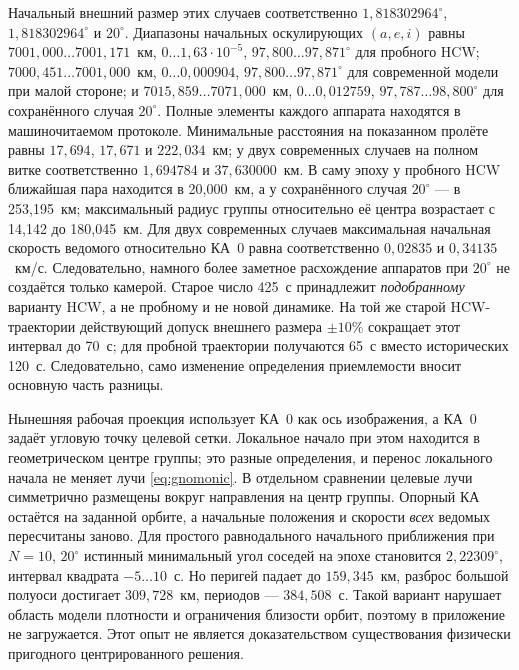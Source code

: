 \documentclass[a4paper,12pt]{article}
\begin{document}
Начальный внешний размер этих случаев соответственно
$1{,}818302964^\circ$, $1{,}818302964^\circ$ и $20^\circ$.
Диапазоны начальных оскулирующих $(a,e,i)$ равны
$7001{,}000\ldots7001{,}171$~км,
$0\ldots1{,}63\cdot10^{-5}$, $97{,}800\ldots97{,}871^\circ$
для пробного HCW; $7000{,}451\ldots7001{,}000$~км,
$0\ldots0{,}000904$, $97{,}800\ldots97{,}871^\circ$
для современной модели при малой стороне; и
$7015{,}859\ldots7071{,}000$~км,
$0\ldots0{,}012759$, $97{,}787\ldots98{,}800^\circ$
для сохранённого случая $20^\circ$. Полные элементы каждого
аппарата находятся в машиночитаемом протоколе. Минимальные
расстояния на показанном пролёте равны $17{,}694$, $17{,}671$ и
$222{,}034$~км; у двух современных случаев на полном витке
соответственно $1{,}694784$ и $37{,}630000$~км.
В саму эпоху у пробного HCW ближайшая пара находится в
20{,}000~км, а у сохранённого случая $20^\circ$ --- в
253{,}195~км; максимальный радиус группы относительно её
центра возрастает с 14{,}142 до 180{,}045~км.
Для двух современных случаев максимальная начальная скорость
ведомого относительно КА~0 равна соответственно $0{,}02835$
и $0{,}34135$~км/с. Следовательно, намного более заметное
расхождение аппаратов при $20^\circ$ не создаётся только камерой.
Старое число 425~с принадлежит \emph{подобранному} варианту HCW,
а не пробному и не новой динамике.
На той же старой HCW-траектории действующий допуск внешнего размера
$\pm10\%$ сокращает этот интервал до 70~с; для пробной траектории
получаются 65~с вместо исторических 120~с. Следовательно, само
изменение определения приемлемости вносит основную часть разницы.

Нынешняя рабочая проекция использует КА~0 как ось изображения,
а КА~0 задаёт угловую точку целевой сетки. Локальное начало
при этом находится в геометрическом центре группы; это разные
определения, и перенос локального начала не меняет лучи
\eqref{eq:gnomonic}. В отдельном сравнении целевые лучи
симметрично размещены вокруг направления на центр группы.
Опорный КА остаётся на заданной орбите, а начальные положения
и скорости \emph{всех} ведомых пересчитаны заново. Для простого
равнодального начального приближения при $N=10$, $20^\circ$
истинный минимальный угол соседей на эпохе становится
$2{,}22309^\circ$, интервал квадрата $-5\ldots10$~с.
Но перигей падает до $159{,}345$~км, разброс большой полуоси
достигает $309{,}728$~км, периодов --- $384{,}508$~с.
Такой вариант нарушает область модели плотности и ограничения
близости орбит, поэтому в приложение не загружается. Этот опыт
не является доказательством существования физически пригодного
центрированного решения.
\end{document}
